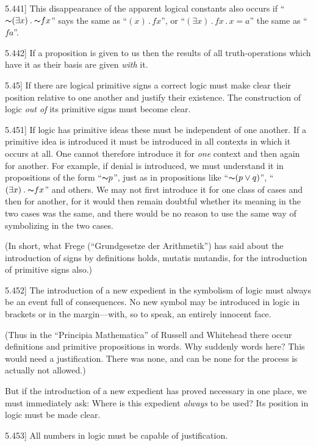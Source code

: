 \documentclass[12pt,oneside]{book}[2007/10/19]
\newcommand{\PropositionE}[2]{%
  \item[\phantomsection\label{PropE:#1}\PropGRef{#1}] #2%
}
\newcommand{\PropGRef}[1]{\hyperref[PropG:#1]{#1}}
\newcommand{\Not}[1]{\mathord{\thicksim} #1}
\newcommand{\DotOp}{\mathbin{.}}
\begin{document}
\begin{propositions}
\PropositionE{5.441}
{This disappearance of the apparent logical
constants also occurs if ``$\Not{(\exists x) \DotOp \Not{fx}}$'' says the
same as ``$(x) \DotOp fx$'', or ``$(\exists x) \DotOp fx \DotOp x = a$'' the same
as ``$fa$''.}


\PropositionE{5.442}
{If a proposition is given to us then the results
of all truth-operations which have it as their basis
are given \emph{with} it.}


\PropositionE{5.45}
{If there are logical primitive signs a correct logic
must make clear their position relative to one
another and justify their existence. The construction
of logic \emph{out of} its primitive signs must become
clear.}


\PropositionE{5.451}
{If logic has primitive ideas these must be
independent of one another. If a primitive idea
is introduced it must be introduced in all contexts
in which it occurs at all. One cannot therefore
introduce it for \emph{one} context and then again for
another. For example, if denial is introduced,
we must understand it in propositions of the form
``$\Not{p}$'', just as in propositions like ``$\Not{(p \lor q)}$'',
``$(\exists x) \DotOp \Not{fx}$'' and others. We may not first
introduce it for one class of cases and then for
another, for it would then remain doubtful whether
its meaning in the two cases was the same, and
there would be no reason to use the same way of
symbolizing in the two cases.

(In short, what Frege (``Grundgesetze der
Arithmetik'') has said about the introduction of
signs by definitions holds, mutatis mutandis, for
the introduction of primitive signs also.)}


\PropositionE{5.452}
{The introduction of a new expedient in the
symbolism of logic must always be an event full
of consequences. No new symbol may be introduced
in logic in brackets or in the margin---with,
so to speak, an entirely innocent face.

(Thus in the ``Principia Mathematica'' of
Russell and Whitehead there occur definitions
and primitive propositions in words. Why suddenly
words here? This would need a justification.
There was none, and can be none for the
process is actually not allowed.)

But if the introduction of a new expedient has
proved necessary in one place, we must immediately
ask: Where is this expedient \emph{always} to be
used? Its position in logic must be made
clear.}


\PropositionE{5.453}
{All numbers in logic must be capable of
justification.

}
\end{propositions}
\end{document}
